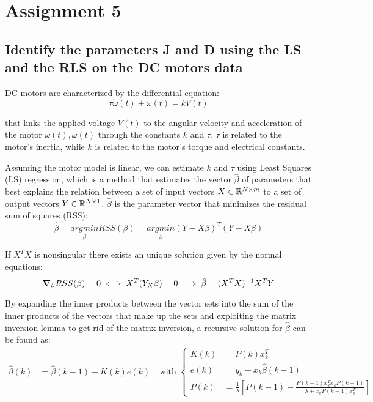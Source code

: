 \section{Assignment 5}

\subsection{Identify the parameters J and D using the LS and the RLS on the DC motors data}

DC motors are characterized by the differential equation:
\begin{equation*}
\tau\dot\omega(t)+\omega(t)=kV(t)
\end{equation*}

that links the applied voltage $V(t)$ to the angular velocity and acceleration of the motor $\omega(t),\dot\omega(t)$ through the constants $k$ and $\tau$. $\tau$ is related to the motor's inertia, while $k$ is related to the motor's torque and electrical constants.

Assuming the motor model is linear, we can estimate $k$ and $\tau$ using Least Squares (LS) regression, which is a method that estimates the vector $\hat\beta$ of parameters that best explains the relation between a set of input vectors $X\in\mathbb{R}^{N\times m}$ to a set of output vectors $Y\in\mathbb{R}^{N\times 1}$. $\hat\beta$ is the parameter vector that minimizes the residual sum of squares (RSS):
\begin{equation*}
\hat\beta = \underset{\beta}{argmin}RSS(\beta)=\underset{\beta}{argmin}(Y-X\beta)^T(Y-X\beta)
\end{equation*}

If $X^TX$ is nonsingular there exists an unique solution given by the normal equations:
\begin{equation*}
\grad_\beta RSS(\beta)=0\iff X^T(Y_X\beta)=0\implies\hat\beta=(X^TX)^{-1}X^TY
\end{equation*}

By expanding the inner products between the vector sets into the sum of the inner products of the vectors that make up the sets and exploiting the matrix inversion lemma to get rid of the matrix inversion, a recursive solution for $\hat\beta$ can be found as:
\begin{align*}
\hat\beta(k)&=\hat\beta(k-1)+K(k)e(k)\;\;\;\;\text{with }\begin{cases}
K(k)&=P(k)x_k^T\\
e(k)&=y_k-x_k\hat\beta(k-1)\\
P(k)&=\frac{1}{\lambda}\left[P(k-1)-\frac{P(k-1)x_k^Tx_kP(k-1)}{\lambda+x_kP(k-1)x_k^T}\right]\end{cases}
\end{align*}

